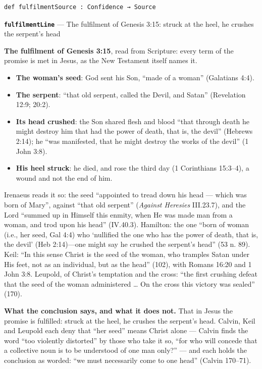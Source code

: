 \documentclass[11pt]{article}
\begin{document}
{\small\begin{verbatim}
def fulfilmentSource : Confidence → Source
\end{verbatim}}
\par\medskip\noindent\textbf{\texttt{fulfilment\allowbreak{}Line}} --- The fulfilment of Genesis 3:15: struck at the heel, he crushes the serpent’s head\par\nobreak\noindent
\textbf{The fulfilment of Genesis 3:15}, read from Scripture: every term of the promise is met in Jesus, as the New Testament itself names it.

\begin{itemize}
  \item \textbf{The woman’s seed}: God sent his Son, “made of a woman” (Galatians 4:4).
  \item \textbf{The serpent}: “that old serpent, called the Devil, and Satan” (Revelation 12:9; 20:2).
  \item \textbf{Its head crushed}: the Son shared flesh and blood “that through death he might destroy him that had the power of death, that is, the devil” (Hebrews 2:14); he “was manifested, that he might destroy the works of the devil” (1 John 3:8).
  \item \textbf{His heel struck}: he died, and rose the third day (1 Corinthians 15:3–4), a wound and not the end of him.
\end{itemize}
Irenaeus reads it so: the seed “appointed to tread down his head — which was born of Mary”, against “that old serpent” (\emph{Against Heresies} III.23.7), and the Lord “summed up in Himself this enmity, when He was made man from a woman, and trod upon his head” (IV.40.3). Hamilton: the one “born of woman (i.e., her seed, Gal 4:4) who ‘nullified the one who has the power of death, that is, the devil’ (Heb 2:14)—one might say he crushed the serpent’s head” (53 n. 89). Keil: “In this sense Christ is the seed of the woman, who tramples Satan under His feet, not as an individual, but as the head” (102), with Romans 16:20 and 1 John 3:8. Leupold, of Christ’s temptation and the cross: “the first crushing defeat that the seed of the woman administered … On the cross this victory was sealed” (170).

\textbf{What the conclusion says, and what it does not.} That in Jesus the promise is fulfilled: struck at the heel, he crushes the serpent’s head. Calvin, Keil and Leupold each deny that “her seed” means Christ alone — Calvin finds the word “too violently distorted” by those who take it so, “for who will concede that a collective noun is to be understood of one man only?” — and each holds the conclusion as worded: “we must necessarily come to one head” (Calvin 170–71).
\end{document}
